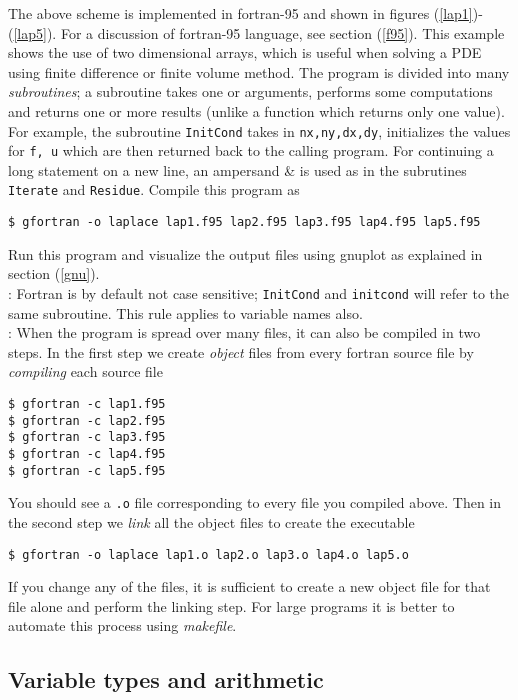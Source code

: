 \documentclass[11pt,oneside]{amsart}
\begin{document}
The above scheme is implemented in fortran-95 and shown in figures (\ref{lap1})-(\ref{lap5}). For a discussion of fortran-95 language, see section (\ref{f95}). This example shows the use of two dimensional arrays, which is useful when solving a PDE using finite difference or finite volume method. The program is divided into many {\em subroutines}; a subroutine takes one or arguments, performs some computations and returns one or more results (unlike a function which returns only one value). For example, the subroutine {\tt InitCond} takes in {\tt nx,ny,dx,dy}, initializes the values for {\tt f, u} which are then returned back to the calling program. For continuing a long statement on a new line, an ampersand \& is used as in the subrutines {\tt Iterate} and {\tt Residue}. Compile this program as
\begin{verbatim}
$ gfortran -o laplace lap1.f95 lap2.f95 lap3.f95 lap4.f95 lap5.f95
\end{verbatim}
Run this program and visualize the output files using gnuplot as explained in section (\ref{gnu}). \\

:
Fortran is by default not case sensitive; {\tt InitCond} and {\tt initcond} will refer to the same subroutine. This rule applies to variable names also.\\

:
When the program is spread over many files, it can also be compiled in two steps. In the first step we create {\em object} files from every fortran source file by {\em compiling} each source file
\begin{verbatim}
$ gfortran -c lap1.f95
$ gfortran -c lap2.f95
$ gfortran -c lap3.f95
$ gfortran -c lap4.f95
$ gfortran -c lap5.f95
\end{verbatim}
You should see a {\tt .o} file corresponding to every file you compiled above. Then in the second step we {\em link} all the object files to create the executable
\begin{verbatim}
$ gfortran -o laplace lap1.o lap2.o lap3.o lap4.o lap5.o
\end{verbatim}
If you change any of the files, it is sufficient to create a new object file for that file alone and perform the linking step. For large programs it is better to automate this process using {\em makefile}.

\subsection{Variable types and arithmetic}
\end{document}
